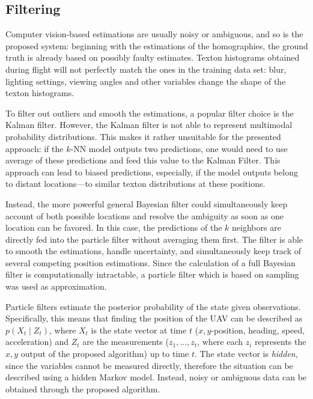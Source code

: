 \documentclass{report}
\begin{document}
\subsection{Filtering}
\label{sec:filtering}

Computer vision-based estimations are usually noisy or ambiguous, and
so is the proposed system: beginning with the estimations of the
homographies, the ground truth is already based on possibly faulty
estimates. Texton histograms obtained during flight will not perfectly
match the ones in the training data set: blur, lighting settings,
viewing angles and other variables change the shape of the texton
histograms.

To filter out outliers and smooth the estimations, a popular filter
choice is the Kalman filter. However, the Kalman filter is not able to
represent multimodal probability distributions. This makes it rather
unsuitable for the presented approach: if the $k$-NN model outputs two
predictions, one would need to use average of these predictions and
feed this value to the Kalman Filter. This approach can lead to biased
predictions, especially, if the model outputs belong to distant
locations---to similar texton distributions at these positions.

Instead, the more powerful general Bayesian filter could
simultaneously keep account of both possible locations and resolve the
ambiguity as soon as one location can be favored. In this case, the
predictions of the $k$ neighbors are directly fed into the particle
filter without averaging them first. The filter is able to smooth the
estimations, handle uncertainty, and simultaneously keep track of
several competing position estimations. Since the calculation of a
full Bayesian filter is computationally intractable, a particle filter
which is based on sampling was used as approximation.

Particle filters estimate the posterior probability of the state given
observations. Specifically, this means that finding the position of
the UAV can be described as $p(X_t \mid Z_t)$, where $X_t$ is the
state vector at time $t$ ($x,y$-position, heading, speed,
acceleration) and $Z_t$ are the measurements ($z_1, ..., z_t$, where
each $z_i$ represents the $x,y$ output of the proposed algorithm) up
to time $t$. The state vector is \emph{hidden}, since the variables
cannot be measured directly, therefore the situation can be described
using a hidden Markov model. Instead, noisy or ambiguous data can be
obtained through the proposed algorithm.
\end{document}
